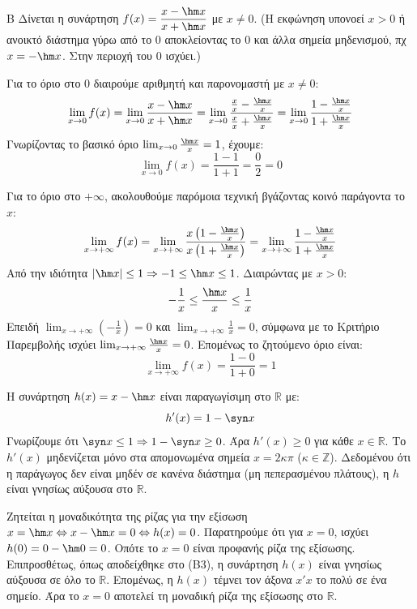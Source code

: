 \begin{thema}{Β}
Δίνεται η συνάρτηση $f(x) = \dfrac{x - \hm x}{x + \hm x}$ με $x \neq 0$. (Η εκφώνηση υπονοεί $x>0$ ή ανοικτό διάστημα γύρω από το 0 αποκλείοντας το 0 και άλλα σημεία μηδενισμού, πχ $x=-\hm x$. Στην περιοχή του $0$ ισχύει.)
\begin{erwthma}
\item Για το όριο στο 0 διαιρούμε αριθμητή και παρονομαστή με $x \neq 0$:
\[ \lim_{x\to0} f(x) = \lim_{x\to0} \frac{x - \hm x}{x + \hm x} = \lim_{x\to0} \frac{\frac{x}{x} - \frac{\hm x}{x}}{\frac{x}{x} + \frac{\hm x}{x}} = \lim_{x\to0} \frac{1 - \frac{\hm x}{x}}{1 + \frac{\hm x}{x}} \]
Γνωρίζοντας το βασικό όριο $\lim_{x\to0} \frac{\hm x}{x} = 1$, έχουμε:
\[ \lim_{x\to0} f(x) = \frac{1 - 1}{1 + 1} = \frac{0}{2} = 0 \]

\item Για το όριο στο $+\infty$, ακολουθούμε παρόμοια τεχνική βγάζοντας κοινό παράγοντα το $x$:
\[ \lim_{x\to+\infty} f(x) = \lim_{x\to+\infty} \frac{x\left(1 - \frac{\hm x}{x}\right)}{x\left(1 + \frac{\hm x}{x}\right)} = \lim_{x\to+\infty} \frac{1 - \frac{\hm x}{x}}{1 + \frac{\hm x}{x}} \]
Από την ιδιότητα $|\hm x| \le 1 \Rightarrow -1 \le \hm x \le 1$. Διαιρώντας με $x > 0$:
\[ -\frac{1}{x} \le \frac{\hm x}{x} \le \frac{1}{x} \]
Επειδή $\lim_{x\to+\infty} \left(-\frac{1}{x}\right) = 0$ και $\lim_{x\to+\infty} \frac{1}{x} = 0$, σύμφωνα με το Κριτήριο Παρεμβολής ισχύει $\lim_{x\to+\infty} \frac{\hm x}{x} = 0$.
Επομένως το ζητούμενο όριο είναι:
\[ \lim_{x\to+\infty} f(x) = \frac{1 - 0}{1 + 0} = 1 \]

\item Η συνάρτηση $h(x) = x - \hm x$ είναι παραγωγίσιμη στο $\mathbb{R} $ με:
\[ h'(x) = 1 - \syn x \]
Γνωρίζουμε ότι $\syn x \le 1 \Rightarrow 1 - \syn x \ge 0$.
Άρα $h'(x) \ge 0$ για κάθε $x \in \mathbb{R}$. Το $h'(x)$ μηδενίζεται μόνο στα απομονωμένα σημεία $x = 2\kappa\pi$ ($\kappa \in \mathbb{Z}$). 
Δεδομένου ότι η παράγωγος δεν είναι μηδέν σε κανένα διάστημα (μη πεπερασμένου πλάτους), η $h$ είναι γνησίως αύξουσα στο $\mathbb{R}$.

\item Ζητείται η μοναδικότητα της ρίζας για την εξίσωση $x = \hm x \Leftrightarrow x - \hm x = 0 \Leftrightarrow h(x) = 0$.
Παρατηρούμε ότι για $x = 0$, ισχύει $h(0) = 0 - \hm 0 = 0$. Οπότε το $x=0$ είναι προφανής ρίζα της εξίσωσης.
Επιπροσθέτως, όπως αποδείχθηκε στο (Β3), η συνάρτηση $h(x)$ είναι γνησίως αύξουσα σε όλο το $\mathbb{R}$. 
Επομένως, η $h(x)$ τέμνει τον άξονα $x'x$ το πολύ σε ένα σημείο. 
Άρα το $x=0$ αποτελεί τη μοναδική ρίζα της εξίσωσης στο $\mathbb{R}$.
\end{erwthma}
\end{thema}

